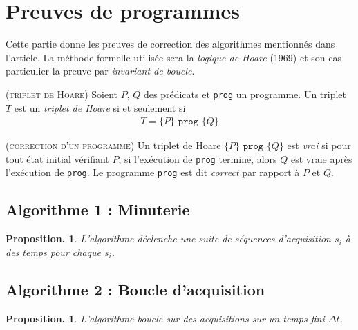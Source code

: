 \documentclass[twocolumn,pre,floats,aps,amsmath,amssymb]{revtex4}
\newtheorem{proposition}[theorem]{Proposition.}
\newenvironment{proof}[1][D\'emonstration.]{\begin{trivlist}
\item[\hskip \labelsep {\bfseries #1}]}{\end{trivlist}}
\newenvironment{definition}[1][D\'efinition.]{\begin{trivlist}
\item[\hskip \labelsep {\bfseries #1}]}{\end{trivlist}}
\begin{document}
\section{Preuves de programmes}
\label{sec:analysis}

{ \color{rltred}{\Radioactivity} }
Cette partie donne les preuves de correction des algorithmes mentionn\'es dans l'article. La m\'ethode formelle utilis\'ee sera la \textit{logique de Hoare}\cite{Hoare} (1969) et son cas particulier la preuve par \textit{invariant de boucle}.

\begin{definition}
  { \color{rltred}{\Radioactivity} }
  \textsc{(triplet de Hoare)}
  Soient $P$, $Q$ des pr\'edicats et \texttt{prog} un programme. Un triplet $T$ est un \textit{triplet de Hoare} si et seulement si
  \begin{eqnarray*}
    T = \{P\} \texttt{ prog } \{Q\}
  \end{eqnarray*}
\end{definition}

\begin{definition}
  { \color{rltred}{\Radioactivity} }
  \textsc{(correction d'un programme)}
  Un triplet de Hoare $\{P\} \texttt{ prog } \{Q\}$ est \textit{vrai} si pour tout \'etat initial v\'erifiant $P$, si l'ex\'ecution de \texttt{prog} termine, alors $Q$ est vraie apr\`es l'ex\'ecution de \texttt{prog}. Le programme \texttt{prog} est dit \textit{correct} par rapport \`a $P$ et $Q$.
\end{definition}

\subsection{Algorithme 1 : Minuterie}

\begin{proposition}
  L'algorithme d\'eclenche une suite de s\'equences d'acquisition $s_i$ \`a des temps pour chaque $s_i$. 
\end{proposition}

\begin{proof}
\end{proof}

\subsection{Algorithme 2 : Boucle d'acquisition}

\begin{proposition}
  L'algorithme boucle sur des acquisitions sur un temps fini $\Delta t$.
\end{proposition}
\end{document}
